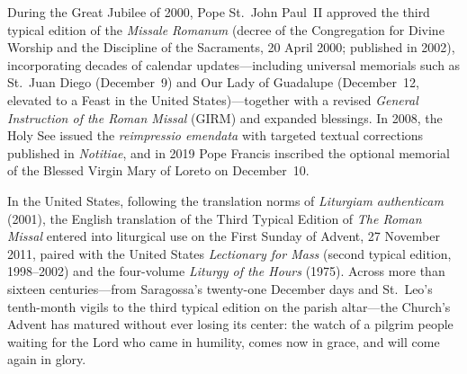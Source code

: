 During the Great Jubilee of 2000, Pope St.~John Paul~II approved the third typical edition of the \textit{Missale Romanum} (decree of the Congregation for Divine Worship and the Discipline of the Sacraments, 20 April 2000; published in 2002), incorporating decades of calendar updates---including universal memorials such as St.~Juan Diego (December~9) and Our Lady of Guadalupe (December~12, elevated to a Feast in the United States)---together with a revised \textit{General Instruction of the Roman Missal} (GIRM) and expanded blessings. In 2008, the Holy See issued the \textit{reimpressio emendata} with targeted textual corrections published in \textit{Notitiae}, and in 2019 Pope Francis inscribed the optional memorial of the Blessed Virgin Mary of Loreto on December~10.

In the United States, following the translation norms of \textit{Liturgiam authenticam} (2001), the English translation of the Third Typical Edition of \textit{The Roman Missal} entered into liturgical use on the First Sunday of Advent, 27 November 2011, paired with the United States \textit{Lectionary for Mass} (second typical edition, 1998--2002) and the four-volume \textit{Liturgy of the Hours} (1975). Across more than sixteen centuries---from Saragossa's twenty-one December days and St.~Leo's tenth-month vigils to the third typical edition on the parish altar---the Church's Advent has matured without ever losing its center: the watch of a pilgrim people waiting for the Lord who came in humility, comes now in grace, and will come again in glory.
